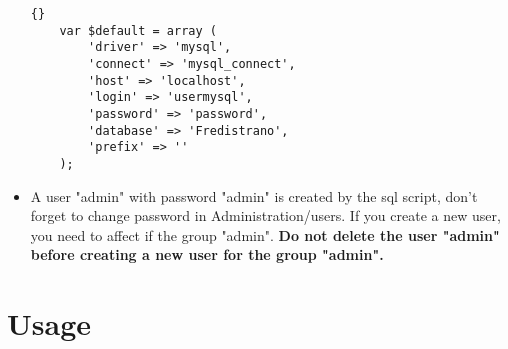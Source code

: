 \documentclass[12pt,a4paper]{report}
\begin{document}
\begin{itemize}
\begin{lstlisting}[frame=tb]{}
	var $default = array (
		'driver' => 'mysql',
		'connect' => 'mysql_connect',
		'host' => 'localhost',
		'login' => 'usermysql',
		'password' => 'password',
		'database' => 'Fredistrano',
		'prefix' => ''
	);
\end{lstlisting}

\item A user "admin" with password "admin" is created by the sql script, don't forget to change password in Administration/users.
If you create a new user, you need to affect if the group "admin".
\textbf{Do not delete the user "admin" before creating a new user for the group "admin".}

\end{itemize}

\chapter{Usage}
\end{document}
